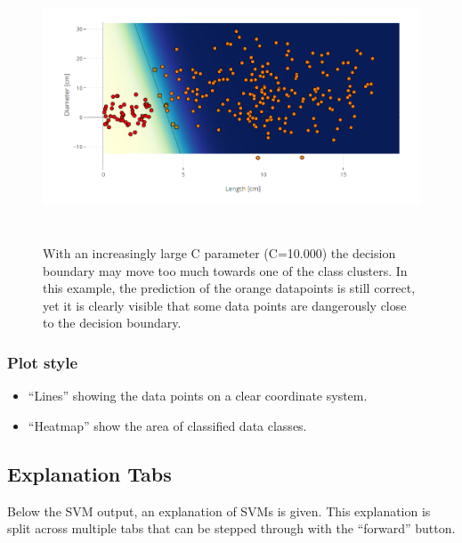 \documentclass{scrartcl}
\begin{document}
\begin{figure}[p]
	\centering
	\includegraphics[height=8cm]{SalmonLin75_10k}
	\caption{With an increasingly large C parameter (C=10.000) the decision boundary may move too much towards one of the class clusters. In this example, the prediction of the orange datapoints is still correct, yet it is clearly visible that some data points are dangerously close to the decision boundary.}%
	\label{fig:largec}%
\end{figure}


\subsubsection*{Plot style}
\begin{itemize}
	\item “Lines” showing the data points on a clear coordinate system.
	\item “Heatmap” show the area of classified data classes.
\end{itemize}

\subsection{Explanation Tabs}

Below the SVM output, an explanation of SVMs is given.
This explanation is split across multiple tabs
that can be stepped through with the “forward” button.


\end{document}

